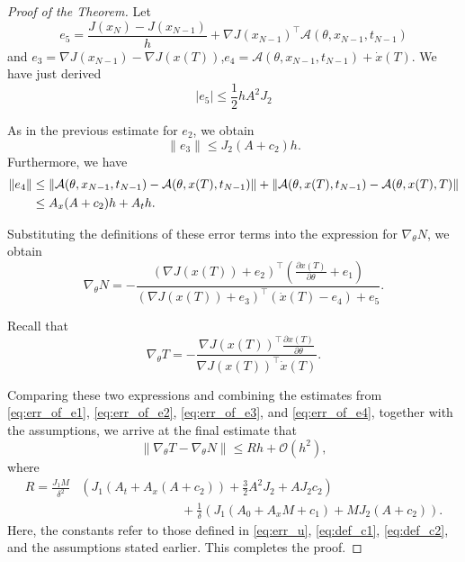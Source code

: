 \documentclass{article}
\begin{document}
\begin{proof}[Proof of the Theorem]
    Let 
    \[
    e_5 = \frac{J(x_N) - J(x_{N-1})}{h} + \nabla J(x_{N-1})^\top \mathcal{A}(\theta,x_{N-1},t_{N-1})
    \]and $e_3 = \nabla J(x_{N-1}) - \nabla J(x(T))$,$e_4 = \mathcal{A}(\theta,x_{N-1},t_{N-1}) + \dot{x}(T)$. We have just derived \begin{equation}
    \label{eq:err_of_e5}
        |e_5|\leq \frac12hA^2J_2
    \end{equation}
    
    As in the previous estimate for $e_2$, we obtain
    \begin{equation}\label{eq:err_of_e3}
        \|e_3\| \leq J_2 (A + c_2) h.
    \end{equation}
    Furthermore, we have
    \begin{align}
        \|e_4\| &\leq \|\mathcal{A}(\theta,x_{N-1},t_{N-1}) - \mathcal{A}(\theta,x(T),t_{N-1})\| + \|\mathcal{A}(\theta,x(T),t_{N-1}) - \mathcal{A}(\theta,x(T),T)\| \notag \\
        &\leq A_x (A + c_2) h + A_t h.\label{eq:err_of_e4}
    \end{align}

    Substituting the definitions of these error terms into the expression for $\nabla_{\theta} N$, we obtain
    \[
        \nabla_{\theta} N = -
        \frac{(\nabla J(x(T)) + e_2)^\top \left( \frac{\partial x(T)}{\partial \theta} + e_1 \right)}{(\nabla J(x(T)) + e_3)^\top (\dot{x}(T) - e_4)+e_5}.
    \]

    Recall that
    \[
        \nabla_{\theta} T = -\frac{\nabla J(x(T))^\top \frac{\partial x(T)}{\partial \theta}}{\nabla J(x(T))^\top \dot{x}(T)}.
    \]

    Comparing these two expressions and combining the estimates from \eqref{eq:err_of_e1}, \eqref{eq:err_of_e2}, \eqref{eq:err_of_e3}, and \eqref{eq:err_of_e4}, together with the assumptions, we arrive at the final estimate that
    \[
        \|\nabla_{\theta} T - \nabla_{\theta} N\| \leq R h + \mathcal{O}(h^2),
    \]
    where
    \begin{align*}
        R = \frac{J_1 M}{\delta^2}& \left( J_1 (A_t + A_x (A + c_2)) + \frac{3}{2} A^2 J_2 + A J_2 c_2 \right)\\
        &\qquad\qquad\qquad\qquad+ \frac{1}{\delta} \left( J_1 (A_0 + A_x M + c_1) + M J_2 (A + c_2) \right).
    \end{align*}
    Here, the constants refer to those defined in \eqref{eq:err_u}, \eqref{eq:def_c1}, \eqref{eq:def_c2}, and the assumptions stated earlier. This completes the proof. 
\end{proof}
\end{document}
